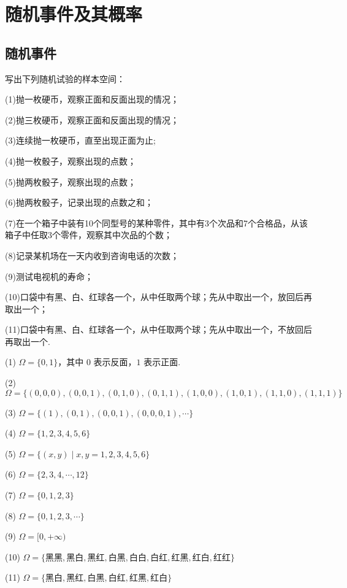 
\chapter{随机事件及其概率}
\thispagestyle{plain}

\section{随机事件}

\question 写出下列随机试验的样本空间：

(1)抛一枚硬币，观察正面和反面出现的情况；

(2)抛三枚硬币，观察正面和反面出现的情况；

(3)连续抛一枚硬币，直至出现正面为止;

(4)抛一枚骰子，观察出现的点数；

(5)抛两枚骰子，观察出现的点数；

(6)抛两枚骰子，记录出现的点数之和；

(7)在一个箱子中装有10个同型号的某种零件，其中有3个次品和7个合格品，从该箱子中任取3个零件，观察其中次品的个数；

(8)记录某机场在一天内收到咨询电话的次数；

(9)测试电视机的寿命；

(10)口袋中有黑、白、红球各一个，从中任取两个球；先从中取出一个，放回后再取出一个；

(11)口袋中有黑、白、红球各一个，从中任取两个球；先从中取出一个，不放回后再取出一个.

\begin{solution}
    (1) $\varOmega = \{ 0, 1 \}$，其中 $0$ 表示反面，$1$ 表示正面.

    (2) $\varOmega = \{ (0,0,0), (0,0,1), (0,1,0), (0,1,1), (1,0,0), (1,0,1), (1,1,0), (1,1,1) \}$

    (3) $\varOmega = \{ (1), (0,1), (0,0,1), (0,0,0,1), \cdots \}$

    (4) $\varOmega = \{ 1,2,3,4,5,6 \}$

    (5) $\varOmega = \{ (x,y) \mid x,y = 1,2,3,4,5,6 \}$

    (6) $\varOmega = \{ 2, 3, 4, \cdots, 12 \}$

    (7) $\varOmega = \{ 0,1,2,3 \}$

    (8) $\varOmega = \{ 0,1,2,3,\cdots \}$

    (9) $\varOmega = [0, +\infty)$

    (10) $\varOmega = \{ \text{黑黑}, \text{黑白}, \text{黑红}, \text{白黑}, \text{白白}, \text{白红}, \text{红黑}, \text{红白}, \text{红红} \}$

    (11) $\varOmega = \{ \text{黑白}, \text{黑红}, \text{白黑}, \text{白红}, \text{红黑}, \text{红白} \}$
\end{solution}


